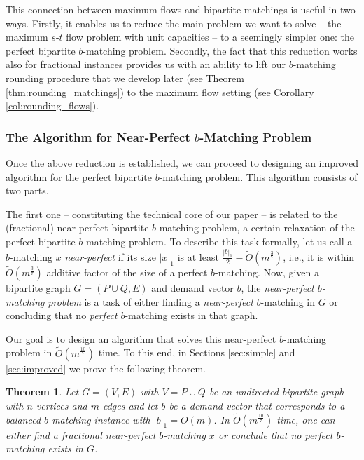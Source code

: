 \documentclass[11pt, letterpaper]{article}
\newtheorem{theorem}{Theorem}[section]
\newcommand{\onorm}[1]{|#1|_{1}}
\newcommand{\tO}[1]{\widetilde{O}(#1)}
\newcommand{\bb}{\boldsymbol{\mathit{b}}}
\newcommand{\xx}{\boldsymbol{\mathit{x}}}
\begin{document}
This connection between maximum flows and bipartite matchings is useful in two ways. Firstly, it enables us to reduce the main problem we want to solve -- the maximum $s$-$t$ flow problem with unit capacities -- to a seemingly simpler one: the perfect bipartite $\bb$-matching problem. Secondly, the fact that this reduction works also for fractional instances provides us with an ability to lift our $\bb$-matching rounding procedure that we develop later (see Theorem \ref{thm:rounding_matchings}) to the maximum flow setting (see Corollary \ref{col:rounding_flows}). 


\subsubsection*{The Algorithm for Near-Perfect $\bb$-Matching Problem}

Once the above reduction is established, we can proceed to designing an improved algorithm for the perfect bipartite $\bb$-matching problem. This algorithm consists of two parts. 

The first one -- constituting the technical core of our paper -- is related to the (fractional) near-perfect bipartite $\bb$-matching problem, a certain relaxation of the perfect bipartite $\bb$-matching problem. To describe this task formally, let us call a $\bb$-matching $\xx$  {\em near-perfect} if its size $\onorm{\xx}$ is at least $\frac{\onorm{\bb}}{2}-\tO{m^{\frac{3}{7}}}$, i.e., it is within $\tO{m^{\frac{3}{7}}}$ additive factor of the size of a perfect $\bb$-matching. Now, given a bipartite graph $G=(P\cup Q,E)$ and demand vector $\bb$, the {\em near-perfect $\bb$-matching problem} is a task of either finding a {\em near-perfect} $\bb$-matching in $G$ or concluding that no {\em perfect} $\bb$-matching exists in that graph.

Our goal is to design an algorithm that solves this near-perfect $\bb$-matching problem in $\tO{m^{\frac{10}{7}}}$ time. To this end, 
in Sections \ref{sec:simple} and \ref{sec:improved} we prove the following theorem. 

\begin{theorem}\label{thm:interior_point_matchings}
Let $G=(V,E)$ with $V=P\cup Q$ be an undirected bipartite graph with $n$ vertices and $m$ edges and let $\bb$ be a demand vector that corresponds to a balanced $\bb$-matching instance with $\onorm{\bb}=O(m)$. In $\tO{m^{\frac{10}{7}}}$ time, one can either find a fractional near-perfect $\bb$-matching $\xx$ or conclude that no perfect $\bb$-matching exists in $G$. 
\end{theorem}
\end{document}

